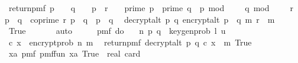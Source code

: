\begin{isabellebody}
\ \ return{\isacharunderscore}{\kern0pt}pmf\ {\isacharparenleft}{\kern0pt}{\isacharparenleft}{\kern0pt}{\isacharparenleft}{\kern0pt}p\ {\isasymin}\ {\isasymK}\ {\isasymand}\ q\ {\isasymin}\ {\isasymK}\ {\isacharminus}{\kern0pt}\ {\isacharbraceleft}{\kern0pt}p{\isacharbraceright}{\kern0pt}\ {\isasymand}\ r\ {\isasymin}\ {\isasymZ}{\isacharparenright}{\kern0pt}\ {\isasymor}\ {\isacharparenleft}{\kern0pt}prime\ p\ {\isasymand}\ prime\ q\ {\isasymand}\ p\ mod\ {}\ {\isacharequal}{\kern0pt}\ {}\ {\isasymand}\ q\ mod\ {}\ {\isacharequal}{\kern0pt}\ {}\ {\isasymand}\ r\ {\isacharless}{\kern0pt}\ p\ {\isacharasterisk}{\kern0pt}\ q\ {\isasymand}\ coprime\ r\ {\isacharparenleft}{\kern0pt}p\ {\isacharasterisk}{\kern0pt}\ q{\isacharparenright}{\kern0pt}\ {\isasymand}\ p\ {\isasymnoteq}\ q{\isacharparenright}{\kern0pt}{\isacharparenright}{\kern0pt}\isanewline
\ {\isasymor}\ decrypt{\isacharunderscore}{\kern0pt}alt\ p\ q\ {\isacharparenleft}{\kern0pt}encrypt{\isacharunderscore}{\kern0pt}alt\ {\isacharparenleft}{\kern0pt}p\ {\isacharasterisk}{\kern0pt}\ q{\isacharparenright}{\kern0pt}\ m\ r{\isacharparenright}{\kern0pt}\ {\isacharequal}{\kern0pt}\ m{\isacharparenright}{\kern0pt}{\isacharbraceright}{\kern0pt}{\isacharparenright}{\kern0pt}\isanewline
\ \ True{\isachardoublequoteclose}\ \isanewline
\ \ \ \ \isamarkupfalse%
\ auto\isanewline
\isanewline
\ \ \isamarkupfalse%
\ \isamarkupfalse%
\ {\isachardoublequoteopen}pmf\ {\isacharparenleft}{\kern0pt}do\ {\isacharbraceleft}{\kern0pt}\isanewline
\ \ {\isacharparenleft}{\kern0pt}n{\isacharcomma}{\kern0pt}\ {\isacharparenleft}{\kern0pt}p{\isacharcomma}{\kern0pt}\ q{\isacharparenright}{\kern0pt}{\isacharparenright}{\kern0pt}\ {\isasymleftarrow}\ key{\isacharunderscore}{\kern0pt}gen{\isacharunderscore}{\kern0pt}prob\ l\ u{\isacharsemicolon}{\kern0pt}\isanewline
\ \ {\isacharparenleft}{\kern0pt}c{\isacharcomma}{\kern0pt}\ x{\isacharparenright}{\kern0pt}\ {\isasymleftarrow}\ {\isacharparenleft}{\kern0pt}encrypt{\isacharunderscore}{\kern0pt}prob\ n\ m{\isacharparenright}{\kern0pt}{\isacharsemicolon}{\kern0pt}\isanewline
\ \ return{\isacharunderscore}{\kern0pt}pmf\ {\isacharparenleft}{\kern0pt}decrypt{\isacharunderscore}{\kern0pt}alt\ p\ q\ {\isacharparenleft}{\kern0pt}c{\isacharcomma}{\kern0pt}\ x{\isacharparenright}{\kern0pt}\ {\isacharequal}{\kern0pt}\ m{\isacharparenright}{\kern0pt}{\isacharbraceright}{\kern0pt}{\isacharparenright}{\kern0pt}\ True\ {\isacharequal}{\kern0pt}\ \isanewline
\ \ {\isacharparenleft}{\kern0pt}{\isasymSum}xa{\isasymin}{\isacharquery}{\kern0pt}{\isasymK}{\isachardot}{\kern0pt}\ pmf\ {\isacharparenleft}{\kern0pt}{\isacharquery}{\kern0pt}pmf{\isacharunderscore}{\kern0pt}fun\ xa{\isacharparenright}{\kern0pt}\ True{\isacharparenright}{\kern0pt}\ {\isacharslash}{\kern0pt}\ real\ {\isacharparenleft}{\kern0pt}card\ {\isacharquery}{\kern0pt}{\isasymK}{\isacharparenright}{\kern0pt}{\isachardoublequoteclose}\isanewline

\end{isabellebody}
